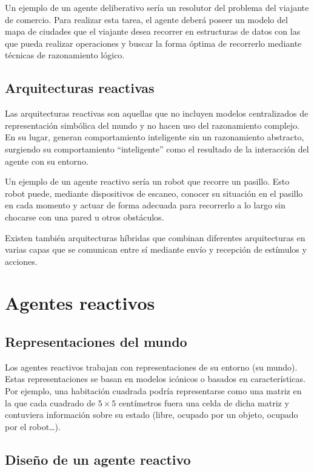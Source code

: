 Un ejemplo de un agente deliberativo sería un resolutor del problema del viajante de comercio.
Para realizar esta tarea, el agente deberá poseer un modelo del mapa de ciudades que el viajante desea recorrer en estructuras de datos con las que pueda realizar operaciones y buscar la forma óptima de recorrerlo mediante técnicas de razonamiento lógico.

\subsection{Arquitecturas reactivas}

Las arquitecturas reactivas son aquellas que no incluyen modelos centralizados de representación simbólica del mundo y no hacen uso del razonamiento complejo.
En su lugar, generan comportamiento inteligente sin un razonamiento abstracto, surgiendo su comportamiento ``inteligente'' como el resultado de la interacción del agente con su entorno.

Un ejemplo de un agente reactivo sería un robot que recorre un pasillo.
Esto robot puede, mediante dispositivos de escaneo, conocer su situación en el pasillo en cada momento y actuar de forma adecuada para recorrerlo a lo largo sin chocarse con una pared u otros obstáculos.

Existen también arquitecturas híbridas que combinan diferentes arquitecturas en varias capas que se comunican entre sí mediante envío y recepción de estímulos y acciones.

\section{Agentes reactivos}

\subsection{Representaciones del mundo}

Los agentes reactivos trabajan con representaciones de su entorno (su mundo).
Estas representaciones se basan en modelos icónicos o basados en características.
Por ejemplo, una habitación cuadrada podría representarse como una matriz en la que cada cuadrado de $5\times5$ centímetros fuera una celda de dicha matriz y contuviera información sobre su estado (libre, ocupado por un objeto, ocupado por el robot\ldots).

\subsection{Diseño de un agente reactivo}

